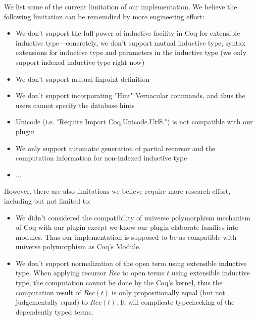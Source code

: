 We list some of the current limitation of our implementation. We believe the following limitation can be rememdied by more engineering effort:
\begin{itemize}
  \item We don't support the full power of inductive facility in Coq for extensible inductive type---concretely, we don't support mutual inductive type, syntax extensions for inductive type and parameters in the inductive type (we only support indexed inductive type right now)
  \item We don't support mutual fixpoint definition
  \item We don't support incorporating "Hint" Vernacular commands, and thus the users cannot specify the database hints
  \item Unicode (i.e. "Require Import Coq.Unicode.Utf8.") is not compatible with our plugin 
  \item We only support automatic generation of partial recursor and the computation information for non-indexed inductive type 
  \item ...
\end{itemize}

However, there are also limitations we believe require more research effort, including but not limited to: 
\begin{itemize}
  \item We didn't considered the compatibility of universe polymorphism mechanism of Coq with our plugin except we know our plugin elaborate families into modules. Thus our implementation is supposed to be as compatible with universe polymorphism as Coq's Module.  
  \item We don't support normalization of the open term using extensible inductive type. When applying recursor $Rec$ to open terms $t$ using extensible inductive type, the computation cannot be done by the Coq's kernel, thus the computation result of $Rec(t)$ is only propositionally equal (but not judgementally equal) to $Rec(t)$. It will complicate typechecking of the dependently typed terms. 
\end{itemize}

